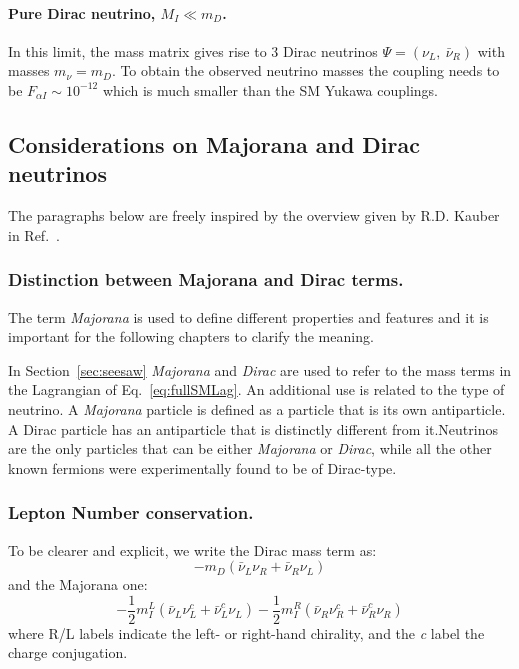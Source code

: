 \paragraph {Pure Dirac neutrino, $M_I \ll m_D$.}
In this limit, the mass matrix gives rise to 3 Dirac neutrinos $\Psi = (\nu_L,\:\bar{\nu}_R)$ with masses $m_\nu = m_D$. To obtain the observed neutrino masses the coupling needs to be $F_{\alpha I} \sim 10^{-12}$ which is much smaller than the SM Yukawa couplings.

\subsection{Considerations on Majorana and Dirac neutrinos}\label{sec:c3majo_dirac}
The paragraphs below are freely inspired by the overview given by
R.D. Kauber in Ref.~\cite{webpage_seesaw}.
\subsubsection {Distinction between Majorana and Dirac terms.}\label{sec:majo_dirac}
The term \emph{Majorana} is used to define different properties and features and it is important for the following chapters to clarify the meaning.

In Section~\ref{sec:seesaw} \emph{Majorana} and \emph{Dirac} are used to
refer to the mass terms in the Lagrangian of Eq.~\ref{eq:fullSMLag}. An additional use is related to the type of neutrino. A \emph{Majorana} particle is defined as a particle that is its own antiparticle.  A Dirac particle has an antiparticle that is distinctly different from it.Neutrinos are the only particles that can be either \emph{Majorana} or \emph{Dirac}, while all the other known fermions were experimentally found to be of Dirac-type.

\subsubsection{Lepton Number conservation.}\label{sec:lnv_lnc}
To be clearer and explicit, we write the Dirac mass term as:
\begin{equation}
\label{eq:c3dirac}
-m_D (\bar{\nu}_L\nu_R + \bar{\nu}_R\nu_L)
\end{equation}
and the Majorana one:
\begin{equation}
\label{eq:c3majorana}
-\frac{1}{2}m^{L}_{I}(\bar{\nu}_L\nu^{c}_L + \bar{\nu}_L^{c}\nu_L) -\frac{1}{2}m^{R}_{I} (\bar{\nu}_R\nu^{c}_R + \bar{\nu}_R^{c}\nu_R)
\end{equation}
where R/L labels indicate the left- or right-hand chirality, and the
\emph{c} label the charge conjugation.

